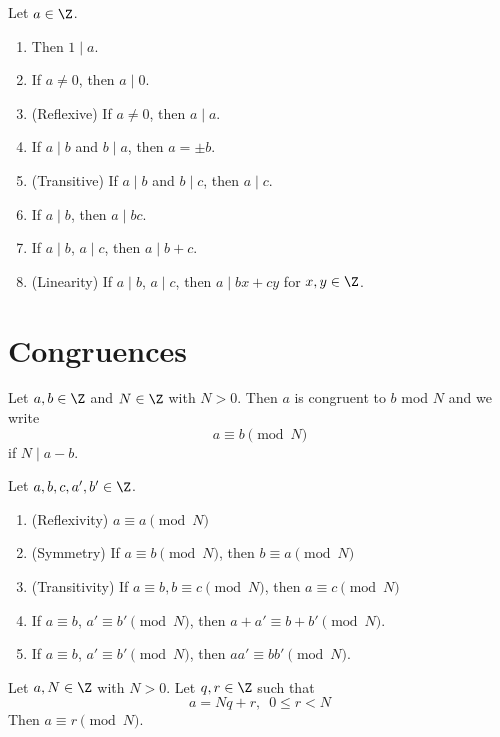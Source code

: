 \begin{prop}
  Let $a \in \Z$.
  \begin{enumerate}[nosep,label=\textnormal{(\alph*)}]
  \item Then $1 \mid a$.
  \item If $a \neq 0$, then $a \mid 0$.
  \item (Reflexive) If $a \neq 0$, then $a \mid a$.
  \item If $a \mid b$ and $b \mid a$, then $a = \pm b$.  
  \item (Transitive) If $a \mid b$ and $b \mid c$, then $a \mid c$.
  \item If $a \mid b$, then $a \mid bc$.
  \item If $a \mid b$, $a \mid c$, then $a \mid b + c$.
  \item (Linearity)
    If $a \mid b$, $a \mid c$, then $a \mid bx + cy$ for $x,y \in \Z$.  
  \end{enumerate}
\end{prop}


\newpage
\section{Congruences}

\begin{defn}
  Let $a, b \in \Z$ and $N \in \Z$ with $N > 0$.
  Then $a$ is congruent to $b$ mod $N$ and we write
  \[
  a \equiv b \pmod{N}
  \]
  if $N \mid a - b$.
\end{defn}


\begin{prop}
  Let $a,b,c,a',b' \in \Z$.
  \begin{enumerate}[nosep,label=\textnormal{(\alph*)}]
  \item (Reflexivity) $a \equiv a \pmod{N}$
  \item (Symmetry) If $a \equiv b \pmod{N}$, then $b \equiv a \pmod{N}$
  \item (Transitivity)
    If $a \equiv b, b \equiv c \pmod{N}$, then
    $a \equiv c \pmod{N}$
  \item
    If
    $a \equiv b$,
    $a' \equiv b' \pmod{N}$,
    then
    $a + a' \equiv b + b' \pmod{N}$.
  \item
    If
    $a \equiv b$,
    $a' \equiv b' \pmod{N}$,
    then
    $a a' \equiv b b' \pmod{N}$.
  \end{enumerate}
\end{prop}


\begin{prop}
  Let $a, N \in \Z$ with $N > 0$.
  Let $q, r \in \Z$ such that
  \[
  a = Nq + r, \,\,\, 0 \leq r < N
  \]
  Then $a \equiv r \pmod{N}$.
\end{prop}
